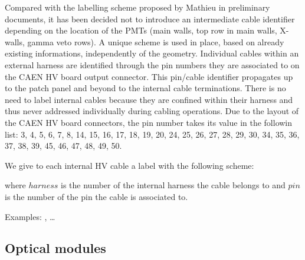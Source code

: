\vskip 10pt Compared with the  labelling scheme proposed by Mathieu in
preliminary  documents,  it   has  been  decided  not   to  introduce  an
intermediate cable  identifier depending on  the location of  the PMTs
(main walls,  top row in  main walls,  X-walls, gamma veto rows).  A unique
scheme   is  used in place,   based   on   already  existing   informations,
independently of  the geometry.  Individual cables  within an external
harness are identified through the  pin numbers they are associated to
on  the CAEN  HV  board  output  connector.    This  pin/cable  identifier
propagates up  to the  patch panel  and beyond  to the  internal cable
terminations.  There is no need  to label internal cables because they
are   confined  within   their  harness   and  thus   never  addressed
individually during cabling operations.
Due to the layout of the CAEN HV board connectors, the pin number takes
its value in the followin list: 3, 4, 5, 6, 7, 8, 14, 15, 16, 17, 18, 19, 20,
24, 25, 26, 27, 28, 29, 30, 34, 35, 36, 37, 38, 39, 45, 46, 47, 48, 49, 50.

\vskip 10pt We give to each
internal HV cable a label with the following scheme:
\begin{center}
 \end{center}
where \texttt{$harness$} is the number of the internal harness the cable belongs to
and  \texttt{$pin$} is the number of the pin the cable is associated to.
\par\noindent Examples: , \dots
{}


\subsection{Optical modules}



